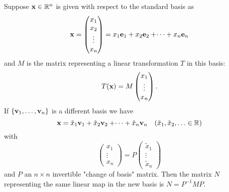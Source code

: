 \documentclass[10pt, a4paper]{article}
\begin{document}
\begin{lemma}
    Suppose $\mathbf{x} \in \mathbb{R} ^ n$ is given with respect to the standard basis as
    \[
    \mathbf{x} = \begin{pmatrix}
        x_1 \\ x_2 \\ \vdots \\ x_n
    \end{pmatrix}
    = x_1\mathbf{e}_1 + x_2\mathbf{e}_2 + \dotsi + x_n\mathbf{e}_n
    \]
    and $M$ is the matrix representing a linear transformation $T$ in this basis:
    \[
    T(\mathbf{x}) = M\begin{pmatrix}
        x_1 \\ \vdots \\ x_n
    \end{pmatrix}.
    \]
    If $\{\mathbf{v}_1, \dotsc, \mathbf{v}_n\}$ is a different basis we have
    \[
    \mathbf{x} = \tilde{x}_1\mathbf{v}_1 + \tilde{x}_2\mathbf{v}_2 + \dotsi + \tilde{x}_n\mathbf{v}_n \quad
    (\tilde{x}_1, \tilde{x}_2, \dotsc \in \mathbb{R})
    \]
    with
    \[
    \begin{pmatrix}
        x_1 \\ \vdots \\ x_n
    \end{pmatrix}
    =
    P\begin{pmatrix}
        \tilde{x}_1 \\ \vdots \\ \tilde{x}_n
    \end{pmatrix}
    \]
    and $P$ an $n \times n$ invertible "change of basis" matrix.
    Then the matrix $N$ representing the same linear map in the new basis is $N = P ^ {-1}MP$.

    \begin{center}
    \end{center}
    \hfill
\end{lemma}
\end{document}
